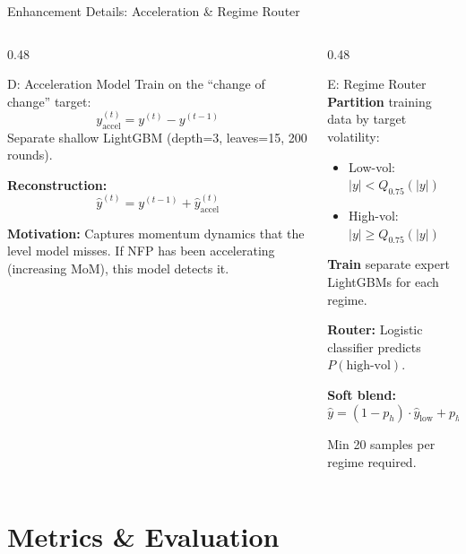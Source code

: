 \documentclass[aspectratio=169,10pt]{beamer}
\begin{document}
\begin{frame}{Enhancement Details: Acceleration \& Regime Router}
\begin{columns}[T]
\begin{column}{0.48\textwidth}
\begin{block}{D: Acceleration Model}
\footnotesize
Train on the ``change of change'' target:
\[
y_{\text{accel}}^{(t)} = y^{(t)} - y^{(t-1)}
\]
Separate shallow LightGBM (depth=3, leaves=15, 200 rounds).

\vspace{0.15cm}
\textbf{Reconstruction:}
\[
\hat{y}^{(t)} = y^{(t-1)} + \hat{y}_{\text{accel}}^{(t)}
\]

\vspace{0.15cm}
\textbf{Motivation:} Captures momentum dynamics that the level model misses. If NFP has been accelerating (increasing MoM), this model detects it.
\end{block}
\end{column}
\begin{column}{0.48\textwidth}
\begin{block}{E: Regime Router}
\footnotesize
\textbf{Partition} training data by target volatility:
\begin{itemize}\scriptsize
  \item Low-vol: $|y| < Q_{0.75}(|y|)$
  \item High-vol: $|y| \ge Q_{0.75}(|y|)$
\end{itemize}

\vspace{0.1cm}
\textbf{Train} separate expert LightGBMs for each regime.

\vspace{0.1cm}
\textbf{Router:} Logistic classifier predicts $P(\text{high-vol})$.

\vspace{0.1cm}
\textbf{Soft blend:}
\[
\hat{y} = (1 - p_h) \cdot \hat{y}_{\text{low}} + p_h \cdot \hat{y}_{\text{high}}
\]

Min 20 samples per regime required.
\end{block}
\end{column}
\end{columns}
\end{frame}

\section{Metrics \& Evaluation}
\end{document}
